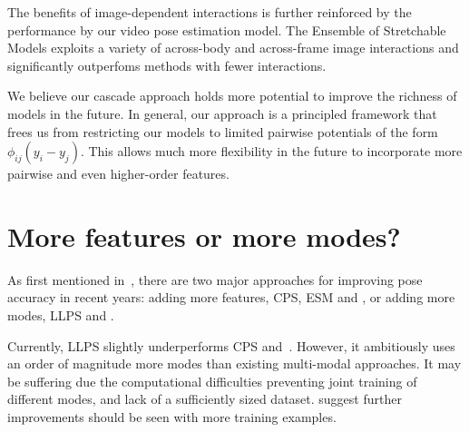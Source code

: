 The benefits of image-dependent interactions is further reinforced by the 
performance by our video pose estimation model.  The Ensemble of Stretchable 
Models exploits a variety of across-body and across-frame image interactions 
and significantly outperfoms methods with fewer interactions.

We believe our cascade approach holds more potential to improve the richness of 
models in the future.  In general, our approach is a principled framework that 
frees us from restricting our models to limited pairwise potentials of the form 
$\phi_{ij}(y_i - y_j)$.  This allows much more flexibility in the future to 
incorporate more pairwise and even higher-order features. 

\section{More features or more modes?}
As first mentioned in~, there are two major approaches for 
improving pose accuracy in recent years: adding more features, \eg CPS, ESM and 
\citet{ferrari08,eichner09,ddtran}, or adding more modes, \eg LLPS and 
\citet{dpm,wang2011,deva2011,johnson11}.  

Currently, LLPS slightly underperforms CPS and~\citet{deva2011}.  However, it 
ambitiously uses an order of magnitude more modes than existing multi-modal 
approaches.  It may be suffering due the computational difficulties preventing 
joint training of different modes, and lack of a sufficiently sized dataset.  
 suggest further improvements should be seen with 
more training examples.

